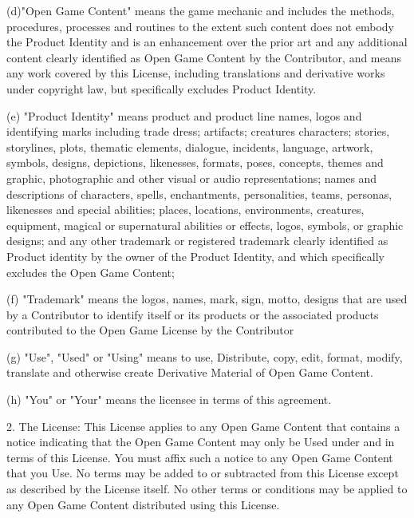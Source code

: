 \documentclass[11pt]{article}
\begin{document}
\bigskip

(d)"Open Game Content" means the game mechanic and includes the methods, procedures, processes and routines to the extent such content does not embody the Product Identity and is an enhancement over the prior art and any additional content clearly identified as Open Game Content by the Contributor, and means any work covered by this License, including translations and derivative works under copyright law, but specifically excludes Product Identity.

\bigskip

(e) "Product Identity" means product and product line names, logos and identifying marks including trade dress; artifacts; creatures characters; stories, storylines, plots, thematic elements, dialogue, incidents, language, artwork, symbols, designs, depictions, likenesses, formats, poses, concepts, themes and graphic, photographic and other visual or audio representations; names and descriptions of characters, spells, enchantments, personalities, teams, personas, likenesses and special abilities; places, locations, environments, creatures, equipment, magical or supernatural abilities or effects, logos, symbols, or graphic designs; and any other trademark or registered trademark clearly identified as Product identity by the owner of the Product Identity, and which specifically excludes the Open Game Content;

\bigskip

(f) "Trademark" means the logos, names, mark, sign, motto, designs that are used by a Contributor to identify itself or its products or the associated products contributed to the Open Game License by the Contributor

\bigskip

(g) "Use", "Used" or "Using" means to use, Distribute, copy, edit, format, modify, translate and otherwise create Derivative Material of Open Game Content.

\bigskip

(h) "You" or "Your" means the licensee in terms of this agreement.

\bigskip

2. The License: This License applies to any Open Game Content that contains a notice indicating that the Open Game Content may only be Used under and in terms of this License. You must affix such a notice to any Open Game Content that you Use. No terms may be added to or subtracted from this License except as described by the License itself. No other terms or conditions may be applied to any Open Game Content distributed using this License.
\end{document}
